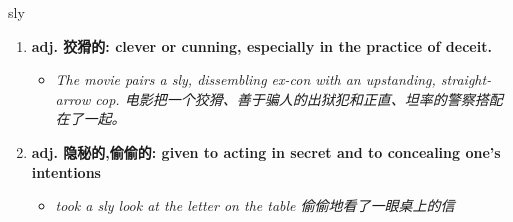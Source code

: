 
\begin{frame}
{\huge sly}
\begin{center}
\begin{enumerate}\Large
  \item \textbf{adj. 狡猾的: clever or cunning, especially in the practice of deceit.}
  \begin{itemize}
    \item \em{\Large{The movie pairs a sly, dissembling ex-con with an upstanding, straight-arrow cop. 电影把一个狡猾、善于骗人的出狱犯和正直、坦率的警察搭配在了一起。}}
  \end{itemize}
  \item \textbf{adj. 隐秘的,偷偷的: given to acting in secret and to concealing one's intentions}
  \begin{itemize}
    \item \em{\Large{took a sly look at the letter on the table 偷偷地看了一眼桌上的信}}
  \end{itemize}
\end{enumerate}
\end{center}
\end{frame}
